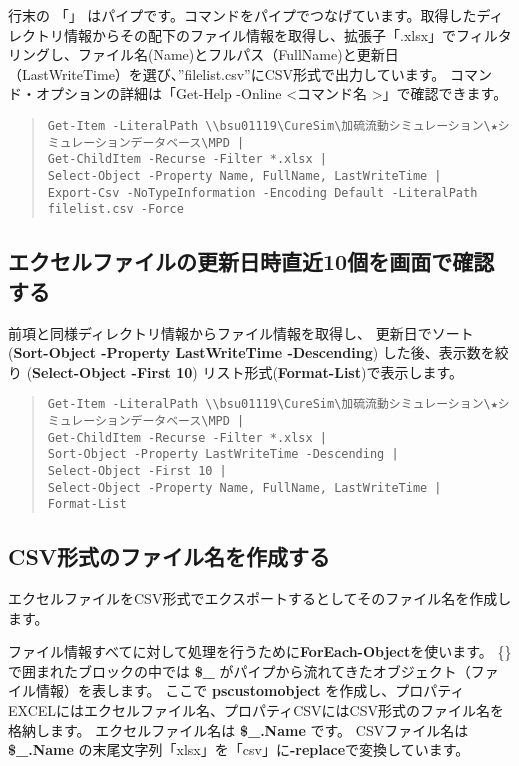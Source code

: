 \documentclass[dvipdfmx]{jsarticle}
\begin{document}
行末の 「\textbar」 はパイプです。コマンドをパイプでつなげています。取得したディレクトリ情報からその配下のファイル情報を取得し、拡張子「.xlsx」でフィルタリングし、ファイル名(Name)とフルパス（FullName)と更新日（LastWriteTime）を選び、''filelist.csv''にCSV形式で出力しています。
コマンド・オプションの詳細は「Get-Help -Online \textless コマンド名 \textgreater」で確認できます。

\begin{quote}
\begin{verbatim}
Get-Item -LiteralPath \\bsu01119\CureSim\加硫流動シミュレーション\★シミュレーションデータベース\MPD |
Get-ChildItem -Recurse -Filter *.xlsx |
Select-Object -Property Name, FullName, LastWriteTime |
Export-Csv -NoTypeInformation -Encoding Default -LiteralPath filelist.csv -Force
\end{verbatim}
\end{quote}


\subsection{エクセルファイルの更新日時直近10個を画面で確認する}

前項と同様ディレクトリ情報からファイル情報を取得し、
更新日でソート(\textbf{Sort-Object -Property LastWriteTime -Descending})
した後、表示数を絞り
(\textbf{Select-Object -First 10})
リスト形式(\textbf{Format-List})で表示します。

\begin{quote}
\begin{verbatim}
Get-Item -LiteralPath \\bsu01119\CureSim\加硫流動シミュレーション\★シミュレーションデータベース\MPD |
Get-ChildItem -Recurse -Filter *.xlsx |
Sort-Object -Property LastWriteTime -Descending |
Select-Object -First 10 |
Select-Object -Property Name, FullName, LastWriteTime |
Format-List
\end{verbatim}
\end{quote}


\subsection{CSV形式のファイル名を作成する}

エクセルファイルをCSV形式でエクスポートするとしてそのファイル名を作成します。

ファイル情報すべてに対して処理を行うために\textbf{ForEach-Object}を使います。
\{\}で囲まれたブロックの中では \textbf{\$\_} がパイプから流れてきたオブジェクト（ファイル情報）を表します。
ここで \textbf{pscustomobject} を作成し、プロパティEXCELにはエクセルファイル名、プロパティCSVにはCSV形式のファイル名を格納します。
エクセルファイル名は \textbf{\$\_.Name} です。
CSVファイル名は \textbf{\$\_.Name} の末尾文字列「xlsx」を「csv」に\textbf{-replace}で変換しています。
\end{document}
